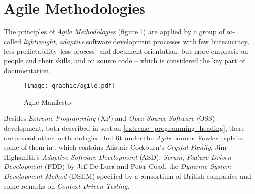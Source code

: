 %
%
%
%
%
%
%

\section{Agile Methodologies}
\label{agile_methodologies_heading}

The principles of \emph{Agile Methodologies} (figure \ref{agile_figure}) are
applied by a group of so-called \emph{lightweight}, \emph{adaptive} software
development processes with few bureaucracy, less predictability, less process-
and document-orientation, but more emphasis on people and their skills, and on
source code -- which is considered the key part of documentation.

\begin{figure}[ht]
    \begin{center}
        \texttt{[image: graphic/agile.pdf]}
        \caption{Agile Manifesto}
        \label{agile_figure}
    \end{center}
\end{figure}

Besides \emph{Extreme Programming} (XP) and \emph{Open Source Software} (OSS)
development, both described in section \ref{extreme_programming_heading}, there
are several other methodologies that fit under the \emph{Agile} banner. Fowler
explains some of them in \cite{fowlernewmethodology}, which contains Alistair
Cockburn's \emph{Crystal Family}, Jim Highsmith's
\emph{Adaptive Software Development} (ASD), \emph{Scrum},
\emph{Feature Driven Development} (FDD) by Jeff De Luca and Peter Coad, the
\emph{Dynamic System Development Method} (DSDM) specified by a consortium of
British companies and some remarks on \emph{Context Driven Testing}.

